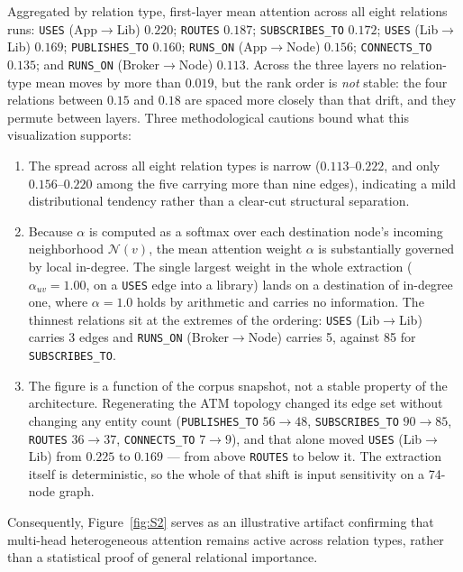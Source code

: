 \documentclass[preprint,3p]{elsarticle}
\begin{document}
\begin{sloppypar}
Aggregated by relation type, first-layer mean attention across all eight relations runs: \texttt{USES} (App$\to$Lib) $0.220$; \texttt{ROUTES} $0.187$; \texttt{SUBSCRIBES\_TO} $0.172$; \texttt{USES} (Lib$\to$Lib) $0.169$; \texttt{PUBLISHES\_TO} $0.160$; \texttt{RUNS\_ON} (App$\to$Node) $0.156$; \texttt{CONNECTS\_TO} $0.135$; and \texttt{RUNS\_ON} (Broker$\to$Node) $0.113$. Across the three layers no relation-type mean moves by more than $0.019$, but the rank order is \emph{not} stable: the four relations between $0.15$ and $0.18$ are spaced more closely than that drift, and they permute between layers. Three methodological cautions bound what this visualization supports:
\end{sloppypar}
\begin{enumerate}
    \item The spread across all eight relation types is narrow ($0.113$--$0.222$, and only $0.156$--$0.220$ among the five carrying more than nine edges), indicating a mild distributional tendency rather than a clear-cut structural separation.
    \item Because $\alpha$ is computed as a softmax over each destination node's incoming neighborhood $\mathcal{N}(v)$, the mean attention weight $\alpha$ is substantially governed by local in-degree. The single largest weight in the whole extraction ($\alpha_{uv} = 1.00$, on a \texttt{USES} edge into a library) lands on a destination of in-degree one, where $\alpha = 1.0$ holds by arithmetic and carries no information. The thinnest relations sit at the extremes of the ordering: \texttt{USES} (Lib$\to$Lib) carries 3 edges and \texttt{RUNS\_ON} (Broker$\to$Node) carries 5, against 85 for \texttt{SUBSCRIBES\_TO}.
    \item The figure is a function of the corpus snapshot, not a stable property of the architecture. Regenerating the ATM topology changed its edge set without changing any entity count (\texttt{PUBLISHES\_TO} $56 \to 48$, \texttt{SUBSCRIBES\_TO} $90 \to 85$, \texttt{ROUTES} $36 \to 37$, \texttt{CONNECTS\_TO} $7 \to 9$), and that alone moved \texttt{USES} (Lib$\to$Lib) from $0.225$ to $0.169$ --- from above \texttt{ROUTES} to below it. The extraction itself is deterministic, so the whole of that shift is input sensitivity on a 74-node graph.
\end{enumerate}
Consequently, Figure~\ref{fig:S2} serves as an illustrative artifact confirming that multi-head heterogeneous attention remains active across relation types, rather than a statistical proof of general relational importance.
\end{document}

